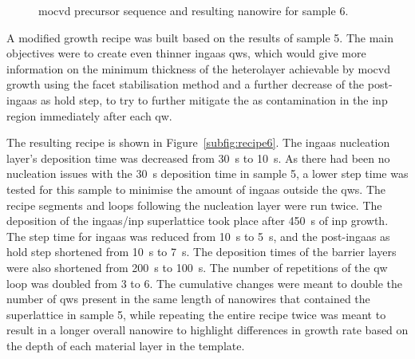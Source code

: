 \begin{figure}
{
    }
    \caption[\acs{mocvd} precursor sequence and resulting nanowire for sample 6.]{ \acs{mocvd} precursor sequence and  resulting nanowire for sample 6.}
    \label{fig:s6_recipe+OV}
\end{figure}

A modified growth recipe was built based on the results of sample 5. The main objectives were to create even thinner \acs{ingaas} \acl{qw}s, which would give more information on the minimum thickness of the heterolayer achievable by \acs{mocvd} growth using the facet stabilisation method and a further decrease of the post-\acs{ingaas} \acl{as} hold step, to try to further mitigate the \acl{as} contamination in the \acs{inp} region immediately after each \acl{qw}.

The resulting recipe is shown in Figure~\ref{subfig:recipe6}. The \acs{ingaas} nucleation layer's deposition time was decreased from \qty{30}{\second} to \qty{10}{\second}. As there had been no nucleation issues with the \qty{30}{\second} deposition time in sample 5, a lower step time was tested for this sample to minimise the amount of \acs{ingaas} outside the \acl{qw}s. The recipe segments and loops following the nucleation layer were run twice. The deposition of the \acs{ingaas}/\acs{inp} superlattice took place after \qty{450}{\second} of \acs{inp} growth. The step time for \acs{ingaas} was reduced from \qty{10}{\second} to \qty{5}{\second}, and the post-\acs{ingaas} \acl{as} hold step shortened from \qty{10}{\second} to \qty{7}{\second}. The deposition times of the barrier layers were also shortened from \qty{200}{\second} to \qty{100}{\second}. The number of repetitions of the \acl{qw} loop was doubled from \num{3} to \num{6}. The cumulative changes were meant to double the number of \acl{qw}s present in the same length of nanowires that contained the superlattice in sample 5, while repeating the entire recipe twice was meant to result in a longer overall nanowire to highlight differences in growth rate based on the depth of each material layer in the template.

